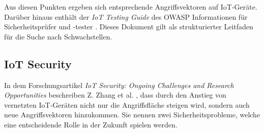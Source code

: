         Aus diesen Punkten ergeben sich entsprechende Angriffsvektoren auf \ac{IoT}-Geräte. Darüber hinaus enthält der \emph{IoT Testing Guide} des \ac{OWASP} Informationen für Sicherheitsprüfer und -tester \cite{smith_2016}. Dieses Dokument gilt als strukturierter Leitfaden für die Suche nach Schwachstellen.
        
    \subsection{\ac{IoT} Security}
        In dem Forschungsartikel \emph{IoT Security: Ongoing Challenges and Research Opportunities} beschreiben Z. Zhang et al. \cite{6978614}, dass durch den Anstieg von vernetzten \ac{IoT}-Geräten nicht nur die Angriffsfläche steigen wird, sondern auch neue Angriffsvektoren hinzukommen.
        Sie nennen zwei Sicherheitsprobleme, welche eine entscheidende Rolle in der Zukunft spielen werden.
